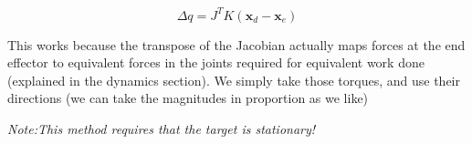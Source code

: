 \documentclass{article}
\renewcommand\vec{\mathbf}
\begin{document}
{        \begin{equation}
            \Delta q = J^{T}K(\vec{x}_{d} - \vec{x}_{e})
        \end{equation}

        This works because the transpose of the Jacobian actually maps forces at the end effector to equivalent forces in the joints required for equivalent work done (explained in the dynamics section). 
        We simply take those torques, and use their directions (we can take the magnitudes in proportion as we like)

        
        \textit{Note:This method requires that the target is stationary!}
    }

\end{document}
